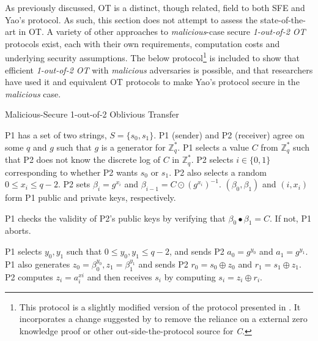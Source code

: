 As previously discussed, \ac{OT} is a distinct, though related, field to both \ac{SFE} and Yao's protocol.  As such, this section does not attempt to assess the state-of-the-art in \ac{OT}.  A variety of other approaches to \emph{malicious}-case secure \emph{1-out-of-2 \ac{OT}} protocols exist\cite{naor2001efficient, kiraz2006protocol, goldreich1987play, naor2005computationally}, each with their own requirements, computation costs and underlying security assumptions.  The below protocol\cite{bellare1990non}\footnote{This protocol is a slightly modified version of the protocol presented in \cite{bellare1990non}.  It incorporates a change suggested by \cite{naor2001efficient} to remove the reliance on a external zero knowledge proof or other out-side-the-protocol source for \emph{C}.} is included to show that efficient \emph{1-out-of-2 \ac{OT}} with \emph{malicious} adversaries is possible, and that researchers have used it and equivalent \ac{OT} protocols to make Yao's protocol secure in the \emph{malicious} case.

\begin{algorithm}[H]
    \caption{Malicious-Secure 1-out-of-2 Oblivious Transfer}
    \label{alg:otmalicious}
    \begin{algorithmic}[1]
        \STATE \ac{P1} has a set of two strings, $S = \{s_0, s_1\}$.
        \STATE \ac{P1} (sender) and \ac{P2} (receiver) agree on some $q$ and $g$ such that $g$ is a generator for $\mathbb{Z}^*_q$.
        \STATE \ac{P1} selects a value  $C$ from $\mathbb{Z}^*_q$ such that \ac{P2} does not know the discrete log of $C$ in $\mathbb{Z}^*_q$.
        \STATE \ac{P2} selects $i \in \{0, 1\}$ corresponding to whether \ac{P2} wants $s_0$ or $s_1$. \ac{P2} also selects a random $0 \leq x_i \leq q-2$.
        \STATE \ac{P2} sets $\beta_i = g^{x_i}$ and $\beta_{i-1} = C \odot (g^{x_i})^{-1}$. $(\beta_0, \beta_1)$ and $(i, x_i)$ form \ac{P1} public and private keys, respectively.

        \STATE \ac{P1} checks the validity of \ac{P2}'s public keys by verifying that $\beta_0 \bullet \beta_1 = C$.  If not, \ac{P1} aborts.

        \STATE \ac{P1} selects $y_0, y_1$ such that $0 \leq y_0, y_1 \leq q-2$, and sends \ac{P2} $a_0 = g^{y_0}$ and $a_1 = g^{y_1}$.
        \STATE \ac{P1} also generates $z_0 = \beta^{y_0}_0, z_1 = \beta^{y_1}_1$ and sends \ac{P2} $r_0 = s_0 \oplus z_0$ and $r_1 = s_1 \oplus z_1$.
        \STATE \ac{P2} computes $z_i = a^{xi}_i$ and then receives $s_i$ by computing $s_i = z_i \oplus r_i$.
    \end{algorithmic}
\end{algorithm}

